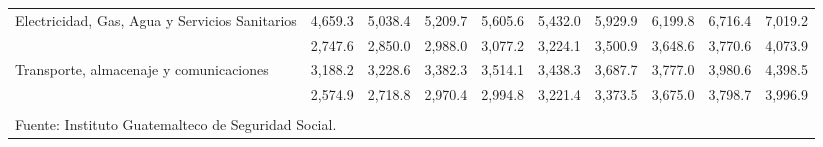 \begin{landscape}
\begin{center}
\begin{spacing}{1.2}
\begin{tabular}{p{5.5cm}ccccccccc}
				\multicolumn{1}{p{5.5cm}}{	Electricidad, Gas, Agua y Servicios Sanitarios	}&	 4,659.3 	 & 	 5,038.4 	 & 	 5,209.7 	 & 	 5,605.6 	 & 	 5,432.0 	 & 	 5,929.9 	 & 	 6,199.8 	 & 	 6,716.4 	 & 	 7,019.2 	 \\ 
				\rowcolor{color1!5!white}\multicolumn{1}{p{5.5cm}}{	Comercio	}&	 2,747.6 	 & 	 2,850.0 	 & 	 2,988.0 	 & 	 3,077.2 	 & 	 3,224.1 	 & 	 3,500.9 	 & 	 3,648.6 	 & 	 3,770.6 	 & 	 4,073.9 	 \\ 
				\multicolumn{1}{p{5.5cm}}{	Transporte, almacenaje y comunicaciones	}&	 3,188.2 	 & 	 3,228.6 	 & 	 3,382.3 	 & 	 3,514.1 	 & 	 3,438.3 	 & 	 3,687.7 	 & 	 3,777.0 	 & 	 3,980.6 	 & 	 4,398.5 	 \\ 
				\rowcolor{color1!5!white}\multicolumn{1}{p{5.5cm}}{	Servicios	}&	 2,574.9 	 & 	 2,718.8 	 & 	 2,970.4 	 & 	 2,994.8 	 & 	 3,221.4 	 & 	 3,373.5 	 & 	 3,675.0 	 & 	 3,798.7 	 & 	 3,996.9 	 \\ 
				\hline
				&&&&&&&&&\\[-0.36cm]
				\multicolumn{10}{l}{\footnotesize Fuente: Instituto Guatemalteco de Seguridad Social.}\\
			\end{tabular}\addtocounter{Cuadro}{1}
		\end{spacing}
	\end{center}
\end{landscape}








